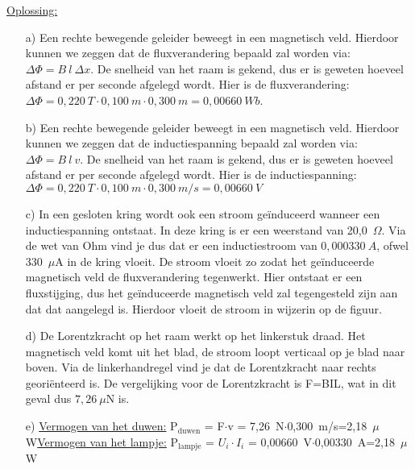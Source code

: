 \documentclass[a4paper,12pt,twoside]{article}%
\begin{document}
\underline{Oplossing:}\\
\begin{enumerate}
	\item[a)] Een rechte bewegende geleider beweegt in een magnetisch veld. Hierdoor kunnen we zeggen dat de fluxverandering bepaald zal worden via: $\Delta\Phi = B~l~\Delta x$. De snelheid van het raam is gekend, dus er is geweten hoeveel afstand er per seconde afgelegd wordt. Hier is de fluxverandering: $\Delta\Phi = 0,220~T\cdot0,100~m\cdot0,300~m=0,00660~Wb$.
	\item[b)] Een rechte bewegende geleider beweegt in een magnetisch veld. Hierdoor kunnen we zeggen dat de inductiespanning bepaald zal worden via: $\Delta\Phi = B~l~v$. De snelheid van het raam is gekend, dus er is geweten hoeveel afstand er per seconde afgelegd wordt. Hier is de inductiespanning: $\Delta\Phi = 0,220~T\cdot0,100~m\cdot0,300~m/s=0,00660~V$
	\item[c)] In een gesloten kring wordt ook een stroom geïnduceerd wanneer een inductiespanning ontstaat. In deze kring is er een weerstand van 20,0~$\Omega$. Via de wet van Ohm vind je dus dat er een inductiestroom van $0,000330~A$, ofwel 330~$\mu$A in de kring vloeit. De stroom vloeit zo zodat het geïnduceerde magnetisch veld de fluxverandering tegenwerkt. Hier ontstaat er een fluxstijging, dus het geïnduceerde magnetisch veld zal tegengesteld zijn aan dat dat aangelegd is. Hierdoor vloeit de stroom in wijzerin op de figuur. 
	\item[d)] De Lorentzkracht op het raam werkt op het linkerstuk draad. Het magnetisch veld komt uit het blad, de stroom loopt verticaal op je blad naar boven. Via de linkerhandregel vind je dat de Lorentzkracht naar rechts georiënteerd is. De vergelijking voor de Lorentzkracht is F=BIL, wat in dit geval dus $7,26~\mu$N is.
	\item[e)] \underline{Vermogen van het duwen:}\newline
				P$_\text{duwen}$ = F$\cdot$v = 7,26~N$\cdot$0,300~m/s=2,18~$\mu$W\newline \underline{Vermogen van het lampje:}\newline
				P$_\text{lampje}$ = $U_i\cdot I_i$ = 0,00660~V$\cdot$0,00330~A=2,18~$\mu$W
\end{enumerate}



 
\end{document}
